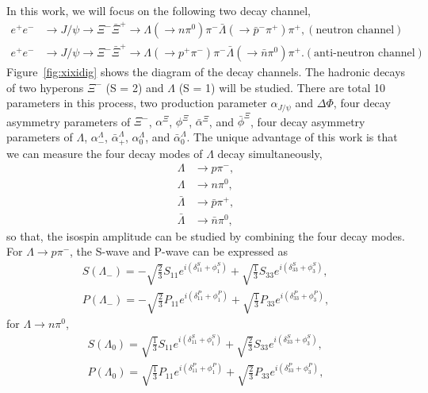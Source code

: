 In this work, we will focus on the following two decay channel,
\begin{subequations}
	\label{eq:xixi}
	\begin{align}
		e^+e^- &\to J/\psi \to \Xi^-\bar{\Xi}^+ \to \Lambda(\to n\pi^0)\pi^- \bar{\Lambda} (\to \bar{p}^-\pi^+)\pi^+, (\text{neutron channel}) \label{eq:neutronchannel}\\
		e^+e^- &\to J/\psi \to \Xi^-\bar{\Xi}^+ \to \Lambda(\to p^+\pi^-)\pi^- \bar{\Lambda} (\to \bar{n}\pi^0)\pi^+. (\text{anti-neutron channel}) \label{eq:antineutronchannel}
	\end{align}
\end{subequations}
Figure~\ref{fig:xixidig} shows the diagram of the decay channels.
The hadronic decays of two hyperons $\Xi^-$ (S = 2) and $\Lambda$ (S = 1) will be
studied. There are total 10 parameters in this process, two production parameter
$\alpha_{J/\psi}$ and $\Delta \Phi$, four decay asymmetry parameters of $\Xi^-$,
$\alpha^{\Xi}$, $\phi^{\Xi}$, $\bar{\alpha}^{\Xi}$, and $\bar{\phi}^{\Xi}$,
four decay asymmetry parameters of $\Lambda$, $\alpha^{\Lambda}_{-}$, 
$\bar{\alpha}^{\Lambda}_{+}$, $\alpha^{\Lambda}_{0}$, and $\bar{\alpha}^{\Lambda}_{0}$.
The unique advantage of this work is that we can measure the four decay modes of 
$\Lambda$ decay simultaneously,
\begin{equation}
	\begin{aligned}
		\Lambda &\to p\pi^-,\\
		\Lambda &\to n\pi^0,\\
		\bar{\Lambda} &\to \bar{p}\pi^+,\\
		\bar{\Lambda} &\to \bar{n}\pi^0,
	\end{aligned}
\end{equation}
so that, the isospin amplitude can be studied by combining the four decay modes. 
For $\Lambda \to p \pi^-$, the S-wave and P-wave can be expressed as
\begin{equation}
	\begin{aligned}
		S(\Lambda_-) = -\sqrt{\frac{2}{3}} S_{11} e^{i(\delta_{11}^S + \phi_1^S)} 
		+ \sqrt{\frac{1}{3}} S_{33} e^{i(\delta_{33}^S + \phi_3^S)},\\
		P(\Lambda_-) = -\sqrt{\frac{2}{3}} P_{11} e^{i(\delta_{11}^P + \phi_1^P)} 
		+ \sqrt{\frac{1}{3}} P_{33} e^{i(\delta_{33}^P + \phi_3^P)},
	\end{aligned}
\end{equation}
for $\Lambda \to n \pi^0$,
\begin{equation}
	\begin{aligned}
		S(\Lambda_0) = \sqrt{\frac{1}{3}} S_{11} e^{i(\delta_{11}^S + \phi_1^S)} 
		+ \sqrt{\frac{2}{3}} S_{33} e^{i(\delta_{33}^S + \phi_3^S)},\\
		P(\Lambda_0) = \sqrt{\frac{1}{3}} P_{11} e^{i(\delta_{11}^P + \phi_1^P)} 
		+ \sqrt{\frac{2}{3}} P_{33} e^{i(\delta_{33}^P + \phi_3^P)},
	\end{aligned}
\end{equation}
